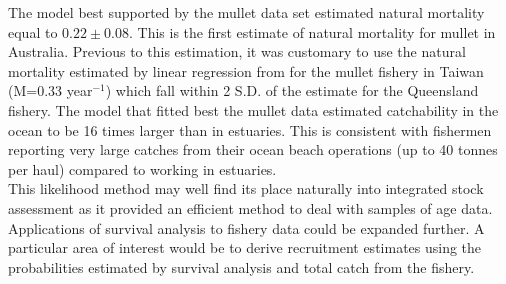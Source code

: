 \documentclass[12pt]{article}
\begin{document}
The model best supported by the mullet data set estimated natural mortality equal to $0.22 \pm 0.08$. This is the first estimate of natural mortality for mullet in Australia. Previous to this estimation, it was customary to use the natural mortality estimated by linear regression from \cite{Hwang82a} for the mullet fishery in Taiwan (M=0.33 year$^{-1}$) which fall within 2 S.D. of the estimate for the Queensland fishery. The model that fitted best the mullet data estimated catchability in the ocean to be 16 times larger than in estuaries. This is consistent with fishermen reporting very large catches from their ocean beach operations (up to 40 tonnes per haul) compared to working in estuaries.\\






This likelihood method may well find its place naturally into integrated stock assessment \citep{Maunder201361} as it provided an efficient method to deal with samples of age data. Applications of survival analysis to fishery data could be expanded further. A particular area of interest would be to derive recruitment estimates using the probabilities estimated by survival analysis and total catch from the fishery.
\end{document}
